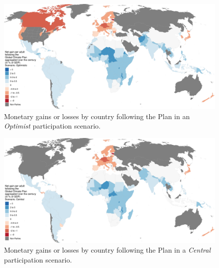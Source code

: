 \documentclass[a5paper,english,openany]{memoir}
\begin{document}
\begin{figure}[h!]
  \caption[Net gains in an \textit{Optimist} participation scenario]{Monetary gains or losses by country following the Plan in an \textit{Optimist} participation scenario.}\label{fig:gain_optimist}
  \centerline{\includegraphics[width=.85\paperwidth]{../figures/maps/Soptimistic_npv_over_gdp_gcs_adj.pdf}} 
\end{figure}
\begin{figure}[b!]
  \caption[Net gains in a \textit{Central} participation scenario]{Monetary gains or losses by country following the Plan in a \textit{Central} participation scenario.}\label{fig:gain_central}
  \centerline{\includegraphics[width=.85\paperwidth]{../figures/maps/Scentral_npv_over_gdp_gcs_adj.pdf}
    } 
\end{figure}

\end{document}
